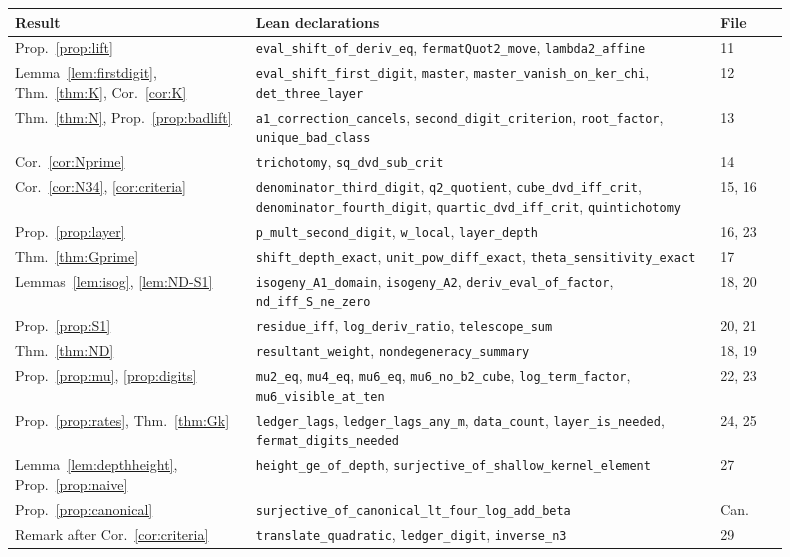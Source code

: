 \documentclass[11pt,a4paper]{amsart}
\newcommand{\lean}[1]{\nolinkurl{#1}}
\theoremstyle{plain}
\theoremstyle{definition}
\theoremstyle{remark}
\begin{document}
\begin{center}\small
\begin{longtable}{p{0.28\linewidth}p{0.54\linewidth}p{0.08\linewidth}}
\toprule
Result & Lean declarations & File\\
\midrule
Prop.~\ref{prop:lift} & \lean{eval_shift_of_deriv_eq}, \lean{fermatQuot2_move}, \lean{lambda2_affine} & 11\\
Lemma~\ref{lem:firstdigit}, Thm.~\ref{thm:K}, Cor.~\ref{cor:K} & \lean{eval_shift_first_digit}, \lean{master}, \lean{master_vanish_on_ker_chi}, \lean{det_three_layer} & 12\\
Thm.~\ref{thm:N}, Prop.~\ref{prop:badlift} & \lean{a1_correction_cancels}, \lean{second_digit_criterion}, \lean{root_factor}, \lean{unique_bad_class} & 13\\
Cor.~\ref{cor:Nprime} & \lean{trichotomy}, \lean{sq_dvd_sub_crit} & 14\\
Cor.~\ref{cor:N34}, \ref{cor:criteria} & \lean{denominator_third_digit}, \lean{q2_quotient}, \lean{cube_dvd_iff_crit}, \lean{denominator_fourth_digit}, \lean{quartic_dvd_iff_crit}, \lean{quintichotomy} & 15, 16\\
Prop.~\ref{prop:layer} & \lean{p_mult_second_digit}, \lean{w_local}, \lean{layer_depth} & 16, 23\\
Thm.~\ref{thm:Gprime} & \lean{shift_depth_exact}, \lean{unit_pow_diff_exact}, \lean{theta_sensitivity_exact} & 17\\
Lemmas~\ref{lem:isog}, \ref{lem:ND-S1} & \lean{isogeny_A1_domain}, \lean{isogeny_A2}, \lean{deriv_eval_of_factor}, \lean{nd_iff_S_ne_zero} & 18, 20\\
Prop.~\ref{prop:S1} & \lean{residue_iff}, \lean{log_deriv_ratio}, \lean{telescope_sum} & 20, 21\\
Thm.~\ref{thm:ND} & \lean{resultant_weight}, \lean{nondegeneracy_summary} & 18, 19\\
Prop.~\ref{prop:mu}, \ref{prop:digits} & \lean{mu2_eq}, \lean{mu4_eq}, \lean{mu6_eq}, \lean{mu6_no_b2_cube}, \lean{log_term_factor}, \lean{mu6_visible_at_ten} & 22, 23\\
Prop.~\ref{prop:rates}, Thm.~\ref{thm:Gk} & \lean{ledger_lags}, \lean{ledger_lags_any_m}, \lean{data_count}, \lean{layer_is_needed}, \lean{fermat_digits_needed} & 24, 25\\
Lemma~\ref{lem:depthheight}, Prop.~\ref{prop:naive} & \lean{height_ge_of_depth}, \lean{surjective_of_shallow_kernel_element} & 27\\
Prop.~\ref{prop:canonical} & \lean{surjective_of_canonical_lt_four_log_add_beta} & Can.\\
Remark after Cor.~\ref{cor:criteria} & \lean{translate_quadratic}, \lean{ledger_digit}, \lean{inverse_n3} & 29\\
\bottomrule
\end{longtable}
\end{center}
\end{document}
